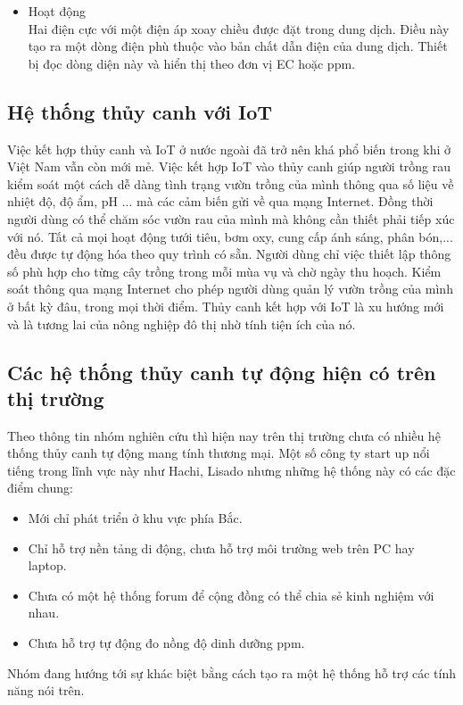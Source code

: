 \documentclass[a4paper,12pt,oneside]{article}
\begin{document}
\begin{itemize}
\item Hoạt động\\
Hai điện cực với một điện áp xoay chiều được đặt trong dung dịch. Điều này tạo ra một dòng điện phù thuộc vào bản chất dẫn điện của dung dịch. Thiết bị đọc dòng diện này và hiển thị theo đơn vị EC hoặc ppm.
\end{itemize}

\subsection{Hệ thống thủy canh với IoT}
\noindent Việc kết hợp thủy canh và IoT ở nước ngoài đã trở nên khá phổ biến trong khi ở Việt Nam vẫn còn mới mẻ. Việc kết hợp IoT vào thủy canh giúp người trồng rau kiểm soát một cách dễ dàng tình trạng vườn trồng của mình thông qua số liệu về nhiệt độ, độ ẩm, pH ... mà các cảm biến gửi về qua mạng Internet. Đồng thời người dùng có thể chăm sóc vườn rau của mình mà không cần thiết phải tiếp xúc với nó. Tất cả mọi hoạt động tưới tiêu, bơm oxy, cung cấp ánh sáng, phân bón,... đều được tự động hóa theo quy trình có sẵn. Người dùng chỉ việc thiết lập thông số phù hợp cho từng cây trồng trong mỗi mùa vụ và chờ ngày thu hoạch. Kiểm soát thông qua mạng Internet cho phép người dùng quản lý vườn trồng của mình ở bất kỳ đâu, trong mọi thời điểm.  Thủy canh kết hợp với IoT là xu hướng mới và là tương lai của nông nghiệp đô thị nhờ tính tiện ích của nó.


\subsection{Các hệ thống thủy canh tự động hiện có trên thị trường}
\noindent Theo thông tin nhóm nghiên cứu thì hiện nay trên thị trường chưa có nhiều hệ thống thủy canh tự động mang tính thương mại. Một số công ty start up nổi tiếng trong lĩnh vực này như Hachi, Lisado nhưng những hệ thống này có các đặc điểm chung:
	\begin{itemize}
		\item Mới chỉ phát triển ở khu vực phía Bắc.
		\item Chỉ hỗ trợ nền tảng di động, chưa hỗ trợ môi trường web trên PC hay laptop.
		\item Chưa có một hệ thống forum để cộng đồng có thể chia sẻ kinh nghiệm với nhau.
		\item Chưa hỗ trợ tự động đo nồng độ dinh dưỡng ppm.
	\end{itemize} 
\noindent Nhóm đang hướng tới sự khác biệt bằng cách tạo ra một hệ thống hỗ trợ các tính năng nói trên.
\end{document}
